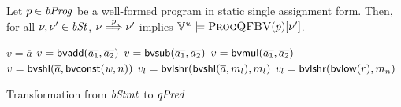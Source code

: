\begin{theorem}
Let $p \in \mathit{bProg}$ be a well-formed program in static single assignment form.
Then, for all $\nu, \nu' \in \mathit{bSt}$, $\nu \overset{p}{\Longrightarrow} \nu'$ implies $\mathbb{V}^{\mathit{w}} \models \textsc{ProgQFBV}(p)[\nu']$.
\end{theorem}

\begin{algorithm}
  \begin{algorithmic}[1]
       \Return $v = \overline{a}$ \EndCase
       \Return $v = \mbox{\textsf{bvadd}}(\overline{a_1}, \overline{a_2})$ \EndCase
      \EndCase
      \EndCase
      \EndCase
       \Return $v = \mbox{\textsf{bvsub}}(\overline{a_1}, \overline{a_2})$ \EndCase
       \Return $v = \mbox{\textsf{bvmul}}(\overline{a_1}, \overline{a_2})$ \EndCase
      \EndCase
       \Return $v = \mbox{\textsf{bvshl}}(\overline{a}, \mbox{\textsf{bvconst}}(\mathit{w}, n))$ \EndCase
        \StatexIndent [2] $v_l = \mbox{\textsf{bvlshr}}(\mbox{\textsf{bvshl}}(\overline{a}, m_l), m_l)$
      \EndCase
        \StatexIndent [2] $v_l = \mbox{\textsf{bvlshr}}(\mbox{\textsf{bvlow}}(r), m_n)$
      \EndCase
    \EndMatch
    \EndFunction
  \end{algorithmic}
  \caption{Transformation from $\mathit{bStmt}$ to $\mathit{qPred}$}
  \label{algorithm:stmt-to-qfbv}
\end{algorithm}

